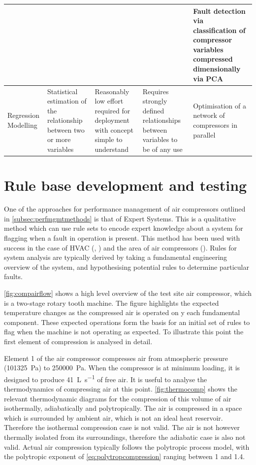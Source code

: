 \begin{center}
\begin{longtable}{p{}p{}p{}p{}p{}}
          &       &       &       & Fault detection via classification of compressor variables compressed dimensionally via PCA \cite{Liu2009}\\
    \midrule
    Regression Modelling & Statistical estimation of the relationship between two or more variables & Reasonably low effort required for deployment with concept simple to understand & Requires strongly defined relationships between variables to be of any use & Optimisation of a network of compressors in parallel \cite{Kopanos2015} \\ %
    \bottomrule
    \end{longtable}%
\end{center}
\twocolumn

\lipsum[1-10]

\section{Rule base development and testing}
\label{sec:rules}
One of the approaches for performance management of air compressors outlined in \autoref{subsec:perfmgmtmethods} is that of Expert Systems. This is a qualitative method which can use rule sets to encode expert knowledge about a system for flagging when a fault in operation is present. This method has been used with success in the case of HVAC (\cite{Bruton2014}, \cite{House2001}) and the area of air compressors (\cite{Liu2001}). Rules for system analysis are typically derived by taking a fundamental engineering overview of the system, and hypothesising potential rules to determine particular faults.

\autoref{fig:compairflow} shows a high level overview of the test site air compressor, which is a two-stage rotary tooth machine. The figure highlights the expected temperature changes as the compressed air is operated on y each fundamental component. These expected operations form the basis for an initial set of rules to flag when the machine is not operating as expected. To illustrate this point the first element of compression is analysed in detail.

Element 1 of the air compressor compresses air from atmospheric pressure (\SI{101325}{\pascal}) to \SI{250000}{\pascal}. When the compressor is at minimum loading, it is designed to produce \SI{41}{\liter \per \second} of free air. It is useful to analyse the thermodynamics of compressing air at this point. \autoref{fig:thermocomp} shows the relevant thermodynamic diagrams for the compression of this volume of air isothermally, adiabatically and polytropically. The air is compressed in a space which is surrounded by ambient air, which is not an ideal heat reservoir. Therefore the isothermal compression case is not valid. The air is not however thermally isolated from its surroundings, therefore the adiabatic case is also not valid. Actual air compression typically follows the polytropic process model, with the polytropic exponent of \autoref{eq:polytropcompression} ranging between 1 and 1.4.


